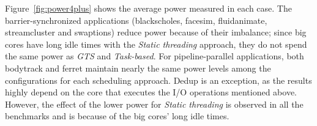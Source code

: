Figure~\ref{fig:power4plus} shows the average power measured in each case. The barrier-synchronized 
applications (blackscholes, facesim, fluidanimate, streamcluster and swaptions) reduce power because 
of their imbalance; since big cores have long idle times with the \emph{Static threading} approach, 
they do not spend the same power as \emph{GTS} and \emph{Task-based}.
For pipeline-parallel applications, both bodytrack and ferret maintain nearly the same 
power levels among the configurations for each scheduling approach. Dedup is an exception, as the 
results highly depend on the core that executes the I/O operations mentioned above. However, the 
effect of the lower power for \emph{Static threading} is observed in all the benchmarks and is 
because of the big cores' long idle times.








